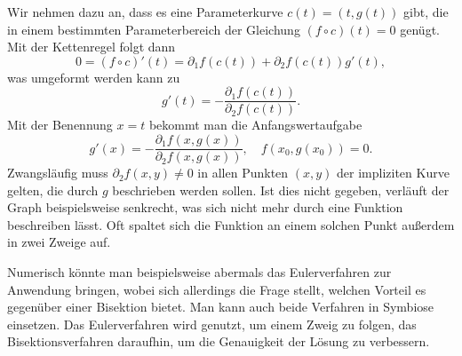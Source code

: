 Wir nehmen dazu an, dass es eine Parameterkurve $c(t)=(t,g(t))$ gibt,
die in einem bestimmten Parameterbereich der Gleichung $(f\circ c)(t)=0$
genügt. Mit der Kettenregel folgt dann 
\[0 = (f\circ c)'(t) = \partial_1 f(c(t)) + \partial_2 f(c(t))g'(t),\]
was umgeformt werden kann zu
\[g'(t) = -\frac{\partial_1 f(c(t))}{\partial_2 f(c(t))}.\]
Mit der Benennung $x=t$ bekommt man die Anfangswertaufgabe
\[g'(x) = -\frac{\partial_1 f(x,g(x))}{\partial_2 f(x,g(x))},\quad
f(x_0,g(x_0)) = 0.\]
Zwangsläufig muss $\partial_2 f(x,y)\ne 0$ in allen Punkten $(x,y)$
der impliziten Kurve gelten, die durch $g$ beschrieben werden sollen.
Ist dies nicht gegeben, verläuft der Graph beispielsweise senkrecht,
was sich nicht mehr durch eine Funktion beschreiben lässt. Oft spaltet
sich die Funktion an einem solchen Punkt außerdem in zwei Zweige auf.

Numerisch könnte man beispielsweise abermals das Eulerverfahren
zur Anwendung bringen, wobei sich allerdings die Frage stellt,
welchen Vorteil es gegenüber einer Bisektion bietet. Man kann auch
beide Verfahren in Symbiose einsetzen. Das Eulerverfahren wird
genutzt, um einem Zweig zu folgen, das Bisektionsverfahren daraufhin, um
die Genauigkeit der Lösung zu verbessern.

